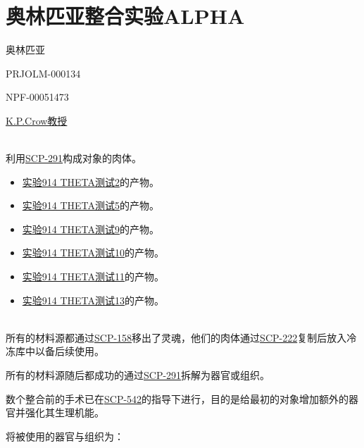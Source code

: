 \chapter{奥林匹亚整合实验ALPHA}

\label{chap:TALE-olympia-integration-experiment-alpha}

奥林匹亚

PRJOLM-000134

NPF-00051473

\hyperref[chap:AUTHOR-kain-pathos-crow]{K.P.Crow教授}

\\
利用\hyperref[chap:SCP-291]{SCP-291}构成对象的肉体。


\begin{itemize}
\item \hyperref[sec:DOC-experiment-log-914-theta.2]{实验914 THETA测试2}的产物。
\item \hyperref[sec:DOC-experiment-log-914-theta.5]{实验914 THETA测试5}的产物。
\item \hyperref[sec:DOC-experiment-log-914-theta.9]{实验914 THETA测试9}的产物。
\item \hyperref[sec:DOC-experiment-log-914-theta.10]{实验914 THETA测试10}的产物。
\item \hyperref[sec:DOC-experiment-log-914-theta.11]{实验914 THETA测试11}的产物。
\item \hyperref[sec:DOC-experiment-log-914-theta.13]{实验914 THETA测试13}的产物。
\end{itemize}

\\
所有的材料源都通过\hyperref[chap:SCP-158]{SCP-158}移出了灵魂，他们的肉体通过\hyperref[chap:SCP-222]{SCP-222}复制后放入冷冻库中以备后续使用。

所有的材料源随后都成功的通过\hyperref[chap:SCP-291]{SCP-291}拆解为器官或组织。

数个整合前的手术已在\hyperref[chap:SCP-542]{SCP-542}的指导下进行，目的是给最初的对象增加额外的器官并强化其生理机能。

将被使用的器官与组织为：

